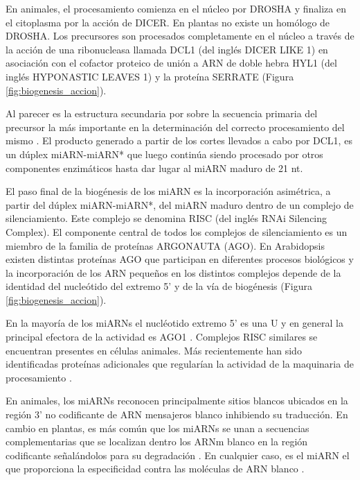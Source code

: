 En animales, el procesamiento comienza en el núcleo por DROSHA y finaliza en el citoplasma por la acción de DICER.
En plantas no existe un homólogo de DROSHA.
Los precursores son procesados completamente en el núcleo a través de la acción de una ribonucleasa llamada DCL1 \citep{Reinhart2002,pmid12417148} (del inglés DICER LIKE 1) en asociación con el cofactor proteico de unión a ARN de doble hebra HYL1 \citep{Han2004} (del inglés HYPONASTIC LEAVES 1) y la proteína SERRATE \citep{Lobbes2006} (Figura \ref{fig:biogenesis_accion}).

Al parecer es la estructura secundaria por sobre la secuencia primaria del precursor la más importante en la determinación del correcto procesamiento del mismo \citep{Bologna11112012} .
El producto generado a partir de los cortes llevados a cabo por DCL1, es un dúplex miARN-miARN* que luego continúa siendo procesado por otros componentes enzimáticos hasta dar lugar al miARN maduro de 21 nt.

El paso final de la biogénesis de los miARN es la incorporación asimétrica, a partir del dúplex miARN-miARN*, del miARN maduro dentro de un complejo de silenciamiento.
Este complejo se denomina RISC (del inglés RNAi Silencing Complex).
El componente central de todos los complejos de silenciamiento es un miembro de la familia de proteínas ARGONAUTA (AGO).
En Arabidopsis existen distintas proteínas AGO que participan en diferentes procesos biológicos \citep{Cellulaire2008} y la incorporación de los ARN pequeños en los distintos complejos depende de la identidad del nucleótido del extremo 5' y de la vía de biogénesis \citep{pmid18342361,Montgomery2008,Takeda2008} (Figura \ref{fig:biogenesis_accion}). 

En la mayoría de los miARNs el nucléotido extremo 5' es una U y en general la principal efectora de la actividad es AGO1 \citep{Voinnet2009669,pmid18342361,Vazquez2004a}.
Complejos RISC similares se encuentran presentes en células animales.
Más recientemente han sido identificadas proteínas adicionales que regularían la actividad de la maquinaria de procesamiento \citep{Bologna11112012}.

En animales, los miARNs reconocen principalmente sitios blancos ubicados en la región 3' no codificante de ARN mensajeros blanco inhibiendo su traducción.
En cambio en plantas, es más común que los miARNs se unan a secuencias complementarias que se localizan dentro los ARNm blanco en la región codificante señalándolos para su degradación \citep{Jones-Rhoades2006}.
En cualquier caso, es el miARN el que proporciona la especificidad contra las moléculas de ARN blanco \citep{Bartel2004}.

